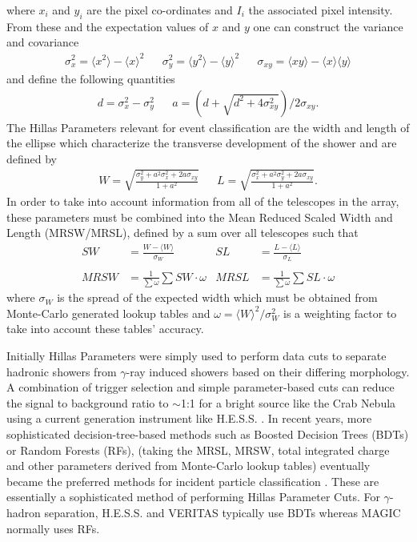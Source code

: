 where $x_i$ and $y_i$ are the pixel co-ordinates and $I_i$ the associated pixel intensity. From these and the expectation values of $x$ and $y$ one can construct the variance and covariance
\begin{align*}
\sigma_x^2=\langle x^2 \rangle - \langle x \rangle^2&&\sigma_y^2=\langle y^2 \rangle - \langle y \rangle^2&&\sigma_{xy}=\langle xy \rangle - \langle x \rangle\langle y \rangle
\end{align*}
and define the following quantities
\begin{align*}
d=\sigma_x^2-\sigma_y^2&&a=(d+\sqrt{d^2+4\sigma_{xy}^2})/2\sigma_{xy}.
\end{align*}
The Hillas Parameters relevant for event classification are the width and length of the ellipse which characterize the transverse development of the shower and are defined by
\begin{align*}
W=\sqrt{\frac{\sigma_y^2+a^2\sigma_x^2+2a\sigma_{xy}}{1+a^2}}&&L=\sqrt{\frac{\sigma_x^2+a^2\sigma_y^2+2a\sigma_{xy}}{1+a^2}}.
\end{align*}
In order to take into account information from all of the telescopes in the array, these parameters must be combined into the Mean Reduced Scaled Width and Length (MRSW/MRSL), defined by a sum over all telescopes such that
\begin{align*}
SW&=\frac{W-\langle W \rangle}{\sigma_W}   &    SL&=\frac{L-\langle L \rangle}{\sigma_L}\\
\\ MRSW&=\frac{1}{\sum \omega}\sum SW\cdot \omega & MRSL&=\frac{1}{\sum \omega}\sum SL\cdot \omega
\end{align*}
where $\sigma_W$ is the spread of the expected width which must be obtained from Monte-Carlo generated lookup tables and $\omega=\langle W \rangle^2/\sigma_W^2$ is a weighting factor to take into account these tables' accuracy.

Initially Hillas Parameters were simply used to perform data cuts to separate hadronic showers from $\gamma$-ray induced showers based on their differing morphology. A combination of trigger selection and simple parameter-based cuts can reduce the signal to background ratio to $\sim$1:1 for a bright source like the Crab Nebula using a current generation instrument like H.E.S.S. \cite{Berge07}. In recent years, more sophisticated decision-tree-based methods such as Boosted Decision Trees (BDTs) or Random Forests (RFs),  (taking the MRSL, MRSW, total integrated charge and other parameters derived from Monte-Carlo lookup tables) eventually became the preferred methods for incident particle classification \cite{hessbdt}. These are essentially a sophisticated method of performing Hillas Parameter Cuts. For $\gamma$-hadron separation, H.E.S.S. \cite{hessbdt} and VERITAS \cite{evdisp} typically use BDTs whereas MAGIC normally uses RFs.

